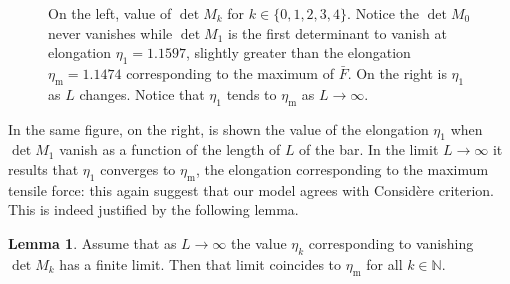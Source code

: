\documentclass[a4paper,10pt,twoside]{amsbook}
\numberwithin{section}{chapter}
\numberwithin{equation}{chapter}
\theoremstyle{definition}
\newtheorem{lemma}[prop]{Lemma}
\begin{document}
\begin{figure}[htp]
\hfill
{}
\caption{On the left, value of $\det M_k$ for $k\in\{0,1,2,3,4\}$. Notice the $\det M_0$ never vanishes while $\det M_1$ is the first determinant to vanish at elongation $\eta_1=1.1597$, slightly greater than the elongation $\eta_\text{m}=1.1474$ corresponding to the maximum of $\bar F$. On the right is $\eta_1$ as $L$ changes. Notice that $\eta_1$ tends to $\eta_\text{m}$ as $L\to\infty$.}
\label{fig:dets}
\end{figure}
In the same figure, on the right, is shown the value of the elongation $\eta_1$ when $\det M_1$ vanish as a function of the length of $L$ of the bar. In the limit $L\to\infty$ it results that $\eta_1$ converges to $\eta_\text{m}$, the elongation corresponding to the maximum tensile force: this again suggest that our model agrees with Considère criterion. This is indeed justified by the following lemma.
\begin{lemma}
Assume that as $L\to\infty$ the value $\eta_k$ corresponding to vanishing $\det M_k$ has a finite limit. Then that limit coincides to $\eta_\text{m}$ for all $k\in\mathbb{N}$.
\end{lemma}
\end{document}
